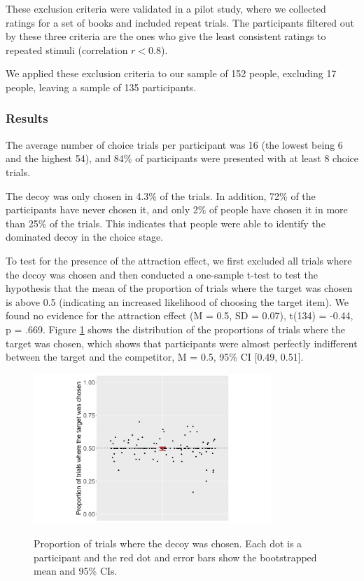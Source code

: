 \documentclass[12pt, a4paper]{article}
\begin{document}
These exclusion criteria were validated in a pilot study, where we collected ratings for a set of books and included repeat trials. The participants filtered out by these three criteria are the ones who give the least consistent ratings to repeated stimuli (correlation $r < 0.8$).

We applied these exclusion criteria to our sample of 152 people, excluding 17 people, leaving a sample of 135 participants.


\subsubsection{Results}

The average number of choice trials per participant was 16 (the lowest being 6 and the highest 54), and 84\% of participants were presented with at least 8 choice trials.

The decoy was only chosen in 4.3\% of the trials. In addition, 72\% of the participants have never chosen it, and only 2\% of people have chosen it in more than 25\% of the trials. This indicates that people were able to identify the dominated decoy in the choice stage.

To test for the presence of the attraction effect, we first excluded all trials where the decoy was chosen and then conducted a one-sample t-test to test the hypothesis that the mean of the proportion of trials where the target was chosen is above 0.5 (indicating an increased likelihood of choosing the target item). We found no evidence for the attraction effect (M = 0.5, SD = 0.07), t(134) = -0.44, p = .669. Figure \ref{fig:exp2_res} shows the distribution of the proportions of trials where the target was chosen, which shows that participants were almost perfectly indifferent between the target and the competitor, M = 0.5, 95\% CI [0.49, 0.51].



\begin{figure}[htb!]
\centering
\captionsetup{justification=centering}
\caption{Proportion of trials where the decoy was chosen. Each dot is a participant and the red dot and error bars show the bootstrapped mean and 95\% CIs.}
\includegraphics[width=0.8\textwidth]{exp2_res.png}
\label{fig:exp2_res}
\end{figure}
\end{document}

